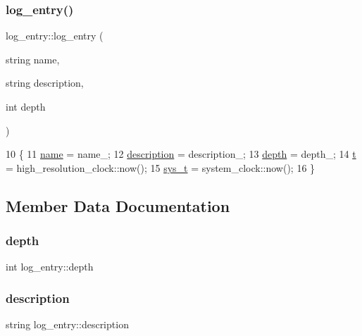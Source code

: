 \subsubsection{\texorpdfstring{log\+\_\+entry()}{log\_entry()}}
{\footnotesize\ttfamily log\+\_\+entry\+::log\+\_\+entry (\begin{DoxyParamCaption}\item[{string}]{name,  }\item[{string}]{description,  }\item[{int}]{depth }\end{DoxyParamCaption})}


\begin{DoxyCode}
10                                                                  \{
11   \hyperlink{classlog__entry_ac65943b778a5978a579d984a6b682def}{name} = name\_;
12   \hyperlink{classlog__entry_a35acb4013a550dd9926c6cccd93300dd}{description} = description\_;
13   \hyperlink{classlog__entry_abfcc98c447997da2eb424a73f5f06da4}{depth} = depth\_;
14   \hyperlink{classlog__entry_a9477b6872dfa3609db1e4e6a97ed5dba}{t} = high\_resolution\_clock::now();
15   \hyperlink{classlog__entry_a2877798c71ba0f0762b821633c8bc517}{sys\_t} = system\_clock::now();
16 \}
\end{DoxyCode}


\subsection{Member Data Documentation}
\mbox{\label{classlog__entry_abfcc98c447997da2eb424a73f5f06da4}} 
\subsubsection{\texorpdfstring{depth}{depth}}
{\footnotesize\ttfamily int log\+\_\+entry\+::depth}

\mbox{\label{classlog__entry_a35acb4013a550dd9926c6cccd93300dd}} 
\subsubsection{\texorpdfstring{description}{description}}
{\footnotesize\ttfamily string log\+\_\+entry\+::description}


